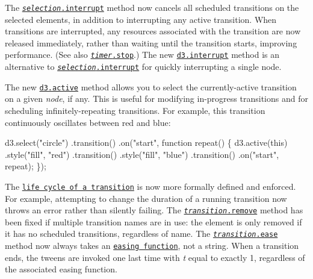 The \href{https://github.com/d3/d3-transition/blob/master/README.md#selection_interrupt}{\tt {\itshape selection}.interrupt} method now cancels all scheduled transitions on the selected elements, in addition to interrupting any active transition. When transitions are interrupted, any resources associated with the transition are now released immediately, rather than waiting until the transition starts, improving performance. (See also \href{https://github.com/d3/d3-timer/blob/master/README.md#timer_stop}{\tt {\itshape timer}.stop}.) The new \href{https://github.com/d3/d3-transition/blob/master/README.md#interrupt}{\tt d3.\+interrupt} method is an alternative to \href{https://github.com/d3/d3-transition/blob/master/README.md#selection_interrupt}{\tt {\itshape selection}.interrupt} for quickly interrupting a single node.

The new \href{https://github.com/d3/d3-transition/blob/master/README.md#active}{\tt d3.\+active} method allows you to select the currently-\/active transition on a given {\itshape node}, if any. This is useful for modifying in-\/progress transitions and for scheduling infinitely-\/repeating transitions. For example, this transition continuously oscillates between red and blue\+:


\begin{DoxyCode}
d3.select("circle")
  .transition()
    .on("start", function repeat() \{
        d3.active(this)
            .style("fill", "red")
          .transition()
            .style("fill", "blue")
          .transition()
            .on("start", repeat);
      \});
\end{DoxyCode}


The \href{https://github.com/d3/d3-transition/blob/master/README.md#the-life-of-a-transition}{\tt life cycle of a transition} is now more formally defined and enforced. For example, attempting to change the duration of a running transition now throws an error rather than silently failing. The \href{https://github.com/d3/d3-transition/blob/master/README.md#transition_remove}{\tt {\itshape transition}.remove} method has been fixed if multiple transition names are in use\+: the element is only removed if it has no scheduled transitions, regardless of name. The \href{https://github.com/d3/d3-transition/blob/master/README.md#transition_ease}{\tt {\itshape transition}.ease} method now always takes an \href{#easings-d3-ease}{\tt easing function}, not a string. When a transition ends, the tweens are invoked one last time with {\itshape t} equal to exactly 1, regardless of the associated easing function.

